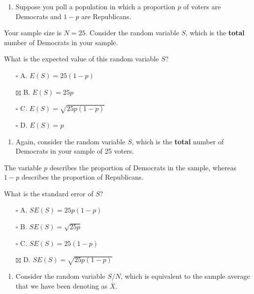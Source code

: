 \documentclass[
]{article}
\providecommand{\tightlist}{%
  \setlength{\itemsep}{0pt}\setlength{\parskip}{0pt}}
\begin{document}
\begin{enumerate}
\def\labelenumi{\arabic{enumi}.}
\tightlist
\item
  Suppose you poll a population in which a proportion \(p\) of voters
  are Democrats and \(1-p\) are Republicans.
\end{enumerate}

Your sample size is \(N = 25\). Consider the random variable \(S\),
which is the \textbf{total} number of Democrats in your sample.

What is the expected value of this random variable \(S\)?

\begin{itemize}
\tightlist
\item[$\square$]
  A. \(E(S) = 25(1−p)\)
\item[$\boxtimes$]
  B. \(E(S) = 25p\)
\item[$\square$]
  C. \(E(S) = \sqrt{25p(1−p)}\)
\item[$\square$]
  D. \(E(S) = p\)
\end{itemize}

\begin{enumerate}
\def\labelenumi{\arabic{enumi}.}
\setcounter{enumi}{1}
\tightlist
\item
  Again, consider the random variable \(S\), which is the \textbf{total}
  number of Democrats in your sample of 25 voters.
\end{enumerate}

The variable \(p\) describes the proportion of Democrats in the sample,
whereas \(1-p\) describes the proportion of Republicans.

What is the standard error of \(S\)?

\begin{itemize}
\tightlist
\item[$\square$]
  A. \(SE(S) = 25p(1−p)\)
\item[$\square$]
  B. \(SE(S) = \sqrt{25p}\)
\item[$\square$]
  C. \(SE(S) = 25(1−p)\)
\item[$\boxtimes$]
  D. \(SE(S) = \sqrt{25p(1−p)}\)
\end{itemize}

\begin{enumerate}
\def\labelenumi{\arabic{enumi}.}
\setcounter{enumi}{2}
\tightlist
\item
  Consider the random variable \(S/N\), which is equivalent to the
  sample average that we have been denoting as \(\overline{X}\).
\end{enumerate}
\end{document}
